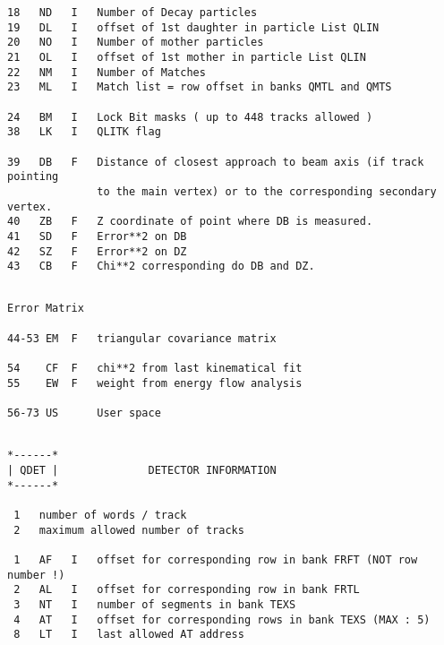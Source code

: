 \begin{verbatim}
18   ND   I   Number of Decay particles
19   DL   I   offset of 1st daughter in particle List QLIN
20   NO   I   Number of mother particles
21   OL   I   offset of 1st mother in particle List QLIN
22   NM   I   Number of Matches
23   ML   I   Match list = row offset in banks QMTL and QMTS
 
24   BM   I   Lock Bit masks ( up to 448 tracks allowed )
38   LK   I   QLITK flag
 
39   DB   F   Distance of closest approach to beam axis (if track pointing
              to the main vertex) or to the corresponding secondary vertex.
40   ZB   F   Z coordinate of point where DB is measured.
41   SD   F   Error**2 on DB
42   SZ   F   Error**2 on DZ
43   CB   F   Chi**2 corresponding do DB and DZ.
 
\end{verbatim}
\begin{verbatim}
Error Matrix
 
44-53 EM  F   triangular covariance matrix
 
54    CF  F   chi**2 from last kinematical fit
55    EW  F   weight from energy flow analysis
 
56-73 US      User space
 
\end{verbatim}
\par
\begin{verbatim}
*------*
| QDET |              DETECTOR INFORMATION
*------*
 
 1   number of words / track
 2   maximum allowed number of tracks
 
 1   AF   I   offset for corresponding row in bank FRFT (NOT row number !)
 2   AL   I   offset for corresponding row in bank FRTL
 3   NT   I   number of segments in bank TEXS
 4   AT   I   offset for corresponding rows in bank TEXS (MAX : 5)
 8   LT   I   last allowed AT address
 
\end{verbatim}
 
